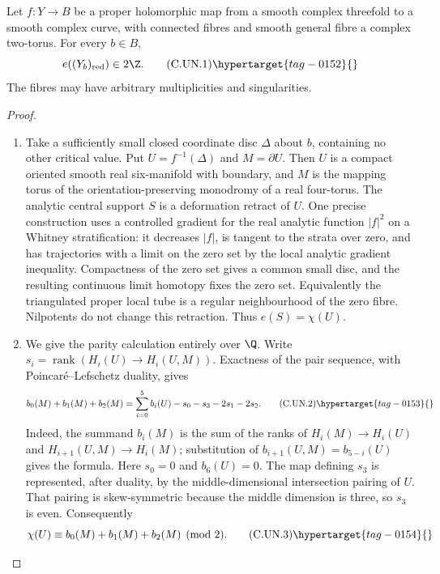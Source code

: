 \begin{proposition}\hypertarget{tag-01CM}{}\label{cdp:st:C.2.UN.1}

Let $f:Y\to B$ be a proper holomorphic map from a smooth complex
threefold to a smooth complex curve, with connected fibres and smooth
general fibre a complex two-torus. For every $b\in B$,
\[
                    e((Y_b)_{\rm red})\in2\Z.       \tag{C.UN.1}\hypertarget{tag-0152}{}\label{cdp:eq:C.UN.1}
\]
The fibres may have arbitrary multiplicities and singularities.
\end{proposition}


\begin{proof}

\begin{enumerate}[label=\arabic*.,leftmargin=*]
\item Take a sufficiently small closed coordinate disc $\Delta$ about $b$,
containing no other critical value. Put $U=f^{-1}(\Delta)$ and
$M=\partial U$. Then $U$ is a compact oriented smooth real six-manifold
with boundary, and $M$ is the mapping torus of the orientation-preserving
monodromy of a real four-torus. The analytic central support $S$ is a
deformation retract of $U$. One precise construction uses a controlled
gradient for the real analytic function $|f|^2$ on a Whitney
stratification: it decreases $|f|$, is tangent to the strata over zero,
and has trajectories with a limit on the zero set by the local
analytic gradient inequality. Compactness of the zero set gives a
common small disc, and the resulting continuous limit homotopy fixes
the zero set. Equivalently the triangulated proper local tube is a
regular neighbourhood of the zero fibre. Nilpotents do not change this
retraction. Thus $e(S)=\chi(U)$.

\item We give the parity calculation entirely over $\Q$. Write
$s_i=\operatorname{rank}(H_i(U)\to H_i(U,M))$.
Exactness of the pair sequence, with Poincar\'e--Lefschetz duality,
gives
\[
 b_0(M)+b_1(M)+b_2(M)
       =\sum_{i=0}^{5}b_i(U)-s_0-s_3-2s_1-2s_2.
                                                        \tag{C.UN.2}\hypertarget{tag-0153}{}\label{cdp:eq:C.UN.2}
\]
Indeed, the summand $b_i(M)$ is the sum of the ranks of
$H_i(M)\to H_i(U)$ and $H_{i+1}(U,M)\to H_i(M)$;
substitution of $b_{i+1}(U,M)=b_{5-i}(U)$ gives the formula.
Here $s_0=0$ and $b_6(U)=0$. The map defining $s_3$ is represented,
after duality, by the middle-dimensional intersection pairing of $U$.
That pairing is skew-symmetric because the middle dimension is three,
so $s_3$ is even. Consequently
\[
 \chi(U)\equiv b_0(M)+b_1(M)+b_2(M)\pmod2.            \tag{C.UN.3}\hypertarget{tag-0154}{}\label{cdp:eq:C.UN.3}
\]


\end{enumerate}
\end{proof}
